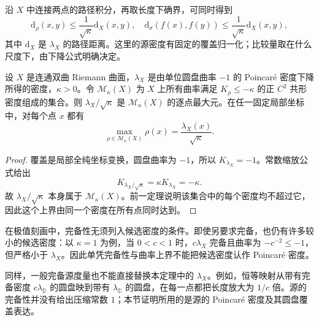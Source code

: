 沿 \(X\) 中连接两点的路径积分，再取长度下确界，可同时得到
\[
 \mathrm d_\rho(x,y)\le\frac{1}{\sqrt\kappa}\mathrm d_X(x,y),
 \quad
 \mathrm d_\sigma(f(x),f(y))\le\frac{1}{\sqrt\kappa}\mathrm d_X(x,y),
\]
其中 \(\mathrm d_X\) 是 \(\lambda_X\) 的路径距离。这里的源密度有固定的覆盖归一化；比较量取在什么尺度下，由下降公式明确决定。

\begin{corollary}[密度的极值刻画]\label{b3:cor:14-density-extremal}
设 \(X\) 是连通双曲 Riemann 曲面，\(\lambda_X\) 是由单位圆盘曲率 \(-1\) 的 Poincaré 密度下降所得的密度，\(\kappa>0\)。令 \(\mathcal M_\kappa(X)\) 为 \(X\) 上所有曲率满足 \(K_\rho\le-\kappa\) 的正 \(C^2\) 共形密度组成的集合。则 \(\lambda_X/\sqrt\kappa\) 是 \(\mathcal M_\kappa(X)\) 的逐点最大元。在任一固定局部坐标中，对每个点 \(x\) 都有
\[
 \max_{\rho\in\mathcal M_\kappa(X)}\rho(x)
 =\frac{\lambda_X(x)}{\sqrt\kappa}.
\]
\end{corollary}
\begin{proof}
覆盖是局部全纯坐标变换，圆盘曲率为 \(-1\)，所以 \(K_{\lambda_X}=-1\)。常数缩放公式给出
\[
 K_{\lambda_X/\sqrt\kappa}=\kappa K_{\lambda_X}=-\kappa.
\]
故 \(\lambda_X/\sqrt\kappa\) 本身属于 \(\mathcal M_\kappa(X)\)。前一定理说明该集合中的每个密度均不超过它，因此这个上界由同一个密度在所有点同时达到。
\end{proof}

在极值刻画中，完备性无须列入候选密度的条件。即使另要求完备，也仍有许多较小的候选密度：以 \(\kappa=1\) 为例，当 \(0<c<1\) 时，\(c\lambda_X\) 完备且曲率为 \(-c^{-2}\le-1\)，但严格小于 \(\lambda_X\)。因此单凭完备性与曲率上界不能把候选密度认作 Poincaré 密度。

\ProseParagraphBreak
同样，一般完备源度量也不能直接替换本定理中的 \(\lambda_X\)。例如，恒等映射从带有完备密度 \(c\lambda_{\mathbb D}\) 的圆盘映到带有 \(\lambda_{\mathbb D}\) 的圆盘，在每一点都把长度放大为 \(1/c\) 倍。源的完备性并没有给出压缩常数 \(1\)；本节证明所用的是源的 Poincaré 密度及其圆盘覆盖表达。
